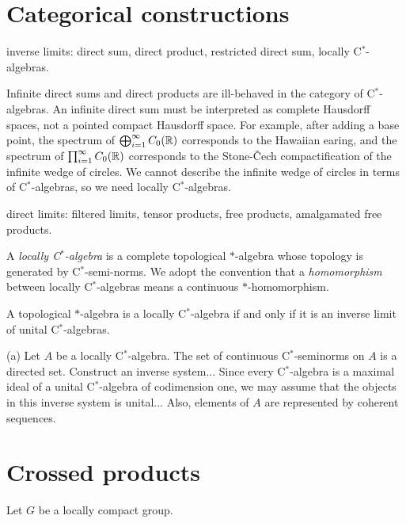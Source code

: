 \documentclass{../../large}
\begin{document}
\section{Categorical constructions}

inverse limits: direct sum, direct product, restricted direct sum, locally C$^*$-algebras.

Infinite direct sums and direct products are ill-behaved in the category of C$^*$-algebras.
An infinite direct sum must be interpreted as complete Hausdorff spaces, not a pointed compact Hausdorff space.
For example, after adding a base point, the spectrum of $\bigoplus_{i=1}^\infty C_0(\mathbb{R})$ corresponds to the Hawaiian earing, and the spectrum of $\prod_{i=1}^\infty C_0(\mathbb{R})$ corresponds to the Stone-\v Cech compactification of the infinite wedge of circles.
We cannot describe the infinite wedge of circles in terms of C$^*$-algebras, so we need locally C$^*$-algebras.


direct limits: filtered limits, tensor products, free products, amalgamated free products.




\begin{prb}
A \emph{locally C$^*$-algebra} is a complete topological $*$-algebra whose topology is generated by C$^*$-semi-norms.
We adopt the convention that a \emph{homomorphism} between locally C$^*$-algebras means a continuous $*$-homomorphism.
\begin{parts}
\item A topological $*$-algebra is a locally C$^*$-algebra if and only if it is an inverse limit of unital C$^*$-algebras.
\end{parts}
\end{prb}
\begin{pf}
(a)
Let $A$ be a locally C$^*$-algebra.
The set of continuous C$^*$-seminorms on $A$ is a directed set.
Construct an inverse system...
Since every C$^*$-algebra is a maximal ideal of a unital C$^*$-algebra of codimension one, we may assume that the objects in this inverse system is unital...
Also, elements of $A$ are represented by coherent sequences.
\end{pf}




\section{Crossed products}


\begin{prb}
Let $G$ be a locally compact group.

\end{prb}
\end{document}
